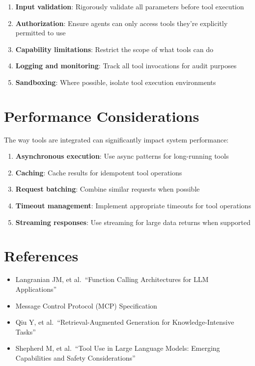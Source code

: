 \documentclass[11pt,oneside]{book}
\providecommand{\tightlist}{%
  \setlength{\itemsep}{0pt}\setlength{\parskip}{0pt}}
\begin{document}
\begin{enumerate}
\def\labelenumi{\arabic{enumi}.}
\tightlist
\item
  \textbf{Input validation}: Rigorously validate all parameters before
  tool execution
\item
  \textbf{Authorization}: Ensure agents can only access tools they're
  explicitly permitted to use
\item
  \textbf{Capability limitations}: Restrict the scope of what tools can
  do
\item
  \textbf{Logging and monitoring}: Track all tool invocations for audit
  purposes
\item
  \textbf{Sandboxing}: Where possible, isolate tool execution
  environments
\end{enumerate}

\section{Performance Considerations}\label{performance-considerations}

The way tools are integrated can significantly impact system
performance:

\begin{enumerate}
\def\labelenumi{\arabic{enumi}.}
\tightlist
\item
  \textbf{Asynchronous execution}: Use async patterns for long-running
  tools
\item
  \textbf{Caching}: Cache results for idempotent tool operations
\item
  \textbf{Request batching}: Combine similar requests when possible
\item
  \textbf{Timeout management}: Implement appropriate timeouts for tool
  operations
\item
  \textbf{Streaming responses}: Use streaming for large data returns
  when supported
\end{enumerate}

\section{References}\label{references-2}

\begin{itemize}
\tightlist
\item
  Langranian JM, et al.~``Function Calling Architectures for LLM
  Applications''
\item
  Message Control Protocol (MCP) Specification
\item
  Qiu Y, et al.~``Retrieval-Augmented Generation for Knowledge-Intensive
  Tasks''
\item
  Shepherd M, et al.~``Tool Use in Large Language Models: Emerging
  Capabilities and Safety Considerations''
\end{itemize}
\end{document}
